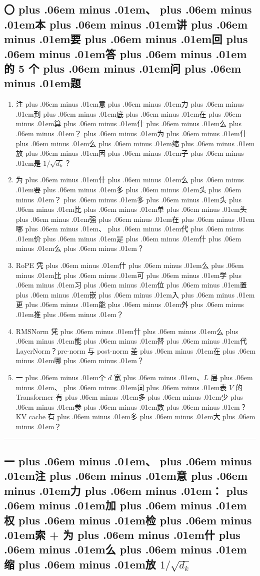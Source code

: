 \documentclass[
]{article}
\providecommand{\tightlist}{%
  \setlength{\itemsep}{0pt}\setlength{\parskip}{0pt}}
\providecommand{\texorpdfstring}[2]{#1}   %
\def\zh#1{{\zhfont #1}}
\def\zhglue{\hskip0pt plus .06em minus .01em}
\begin{document}
\subsection{\zh{〇\zhglue 、\zhglue 本\zhglue 讲\zhglue 要\zhglue 回\zhglue 答\zhglue 的} 5 \zh{个\zhglue 问\zhglue 题}}\label{ux672cux8bb2ux8981ux56deux7b54ux7684-5-ux4e2aux95eeux9898-3}

\begin{enumerate}
\def\labelenumi{\arabic{enumi}.}
\tightlist
\item
  \zh{注\zhglue 意\zhglue 力\zhglue 到\zhglue 底\zhglue 在\zhglue 算\zhglue 什\zhglue 么\zhglue ？\zhglue 为\zhglue 什\zhglue 么\zhglue 缩\zhglue 放\zhglue 因\zhglue 子\zhglue 是} \(1/\sqrt{d_k}\)\zh{？}
\item
  \zh{为\zhglue 什\zhglue 么\zhglue 要\zhglue 多\zhglue 头\zhglue ？\zhglue 多\zhglue 头\zhglue 比\zhglue 单\zhglue 头\zhglue 强\zhglue 在\zhglue 哪\zhglue 、\zhglue 代\zhglue 价\zhglue 是\zhglue 什\zhglue 么\zhglue ？}
\item
  RoPE \zh{凭\zhglue 什\zhglue 么\zhglue 比\zhglue 可\zhglue 学\zhglue 习\zhglue 位\zhglue 置\zhglue 嵌\zhglue 入\zhglue 更\zhglue 能\zhglue 外\zhglue 推\zhglue ？}
\item
  RMSNorm \zh{凭\zhglue 什\zhglue 么\zhglue 能\zhglue 替\zhglue 代} LayerNorm\zh{？}pre-norm \zh{与} post-norm \zh{差\zhglue 在\zhglue 哪\zhglue ？}
\item
  \zh{一\zhglue 个} \(d\) \zh{宽\zhglue 、}\(L\) \zh{层\zhglue 、\zhglue 词\zhglue 表} \(V\) \zh{的} Transformer \zh{有\zhglue 多\zhglue 少\zhglue 参\zhglue 数\zhglue ？}KV cache \zh{有\zhglue 多\zhglue 大\zhglue ？}
\end{enumerate}

\begin{center}\rule{0.5\linewidth}{0.5pt}\end{center}

\subsection{\texorpdfstring{\zh{一\zhglue 、\zhglue 注\zhglue 意\zhglue 力\zhglue ：\zhglue 加\zhglue 权\zhglue 检\zhglue 索} + \zh{为\zhglue 什\zhglue 么\zhglue 缩\zhglue 放} \(1/\sqrt{d_k}\)}{\zh{一\zhglue 、\zhglue 注\zhglue 意\zhglue 力\zhglue ：\zhglue 加\zhglue 权\zhglue 检\zhglue 索} + \zh{为\zhglue 什\zhglue 么\zhglue 缩\zhglue 放} 1/\textbackslash sqrt\{d\_k\}}}\label{ux4e00ux6ce8ux610fux529bux52a0ux6743ux68c0ux7d22-ux4e3aux4ec0ux4e48ux7f29ux653e-1sqrtd_k}
\end{document}
